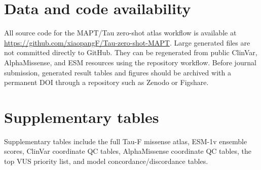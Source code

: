 \documentclass[11pt]{article}
\begin{document}
\section{Data and code availability}

All source code for the MAPT/Tau zero-shot atlas workflow is available at
\url{https://github.com/xiaopangF/Tau-zero-shot-MAPT}. Large generated files are
not committed directly to GitHub. They can be regenerated from public ClinVar,
AlphaMissense, and ESM resources using the repository workflow. Before journal
submission, generated result tables and figures should be archived with a
permanent DOI through a repository such as Zenodo or Figshare.

\section{Supplementary tables}

Supplementary tables include the full Tau-F missense atlas, ESM-1v ensemble
scores, ClinVar coordinate QC tables, AlphaMissense coordinate QC tables, the top
VUS priority list, and model concordance/discordance tables.



\end{document}
